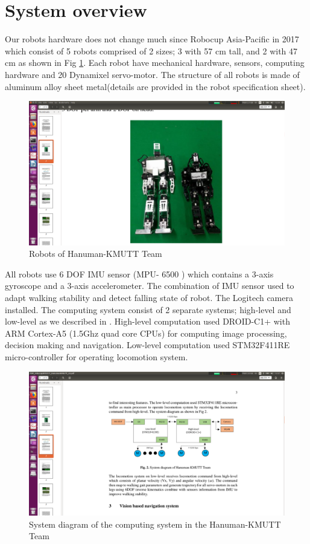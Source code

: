 \section{System overview}
Our robots hardware does not change much since Robocup Asia-Pacific in 2017 which consist of 5 robots comprised of 2 sizes; 3 with 57 cm tall, and 2 with 47 cm as shown in Fig \ref{fig:humanoid}. Each robot have mechanical hardware, sensors, computing hardware and 20 Dynamixel servo-motor. The structure of all robots is made of aluminum alloy sheet metal(details are provided in the robot specification sheet).
\begin{figure}[H]
	\centering
	\includegraphics[width=\textwidth,trim={15cm 0cm 5cm 5cm},clip]{image/humanoid.png}
	\caption{Robots of Hanuman-KMUTT Team}
	\label{fig:humanoid}
\end{figure}
All robots use 6 DOF IMU sensor (MPU- 6500 ) which contains a 3-axis gyroscope and a 3-axis accelerometer. The combination of IMU sensor used to adapt walking stability and detect falling state of robot. The Logitech camera installed. The computing system consist of 2 separate systems; high-level and low-level as we described in \cite{TDP:Nakarin}. High-level computation used DROID-C1+ with ARM Cortex-A5 (1.5Ghz quad core CPUs) for computing image processing, decision making and navigation. Low-level computation used STM32F411RE micro-controller for operating locomotion system.
\begin{figure}[H]
	\centering
	\includegraphics[width=\textwidth,trim={20cm 15cm 10cm 12.5cm},clip]{image/sysDiagram.png}
	\caption{System diagram of the computing system in the Hanuman-KMUTT Team}
	\label{fig:sysDiagram}
\end{figure}
